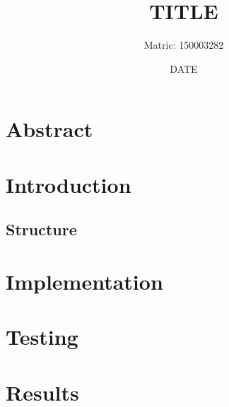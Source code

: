 \documentclass[a4paper,11pt]{article}
\title{TITLE}
\author{Matric: 150003282}
\date{DATE}
\begin{document}
	
	\maketitle
	\section*{Abstract}
	
	\pagebreak
	\section{Introduction}
	\subsection{Structure}
	
	\section{Implementation}
	
	\section{Testing}

	\section{Results}
	
	\pagebreak

	
	
\end{document}
